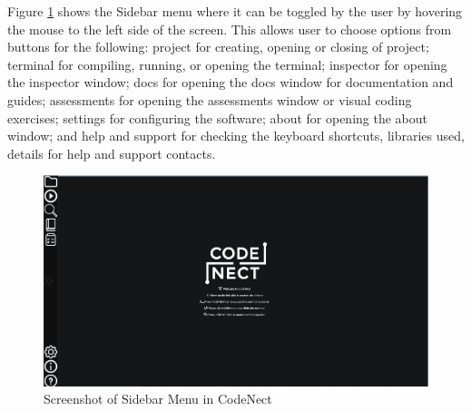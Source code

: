\parx
Figure \ref{fig:cn_sidebar} shows the Sidebar menu where it can be toggled by the user
by hovering the mouse to the left side of the screen. This allows user to choose
options from buttons for the following: project for creating, opening or closing
of project; terminal for compiling, running, or opening the terminal; inspector for
opening the inspector window; docs for opening the docs window for documentation and
guides; assessments for opening the assessments window or visual coding exercises;
settings for configuring the software; about for opening the about window; and help
and support for checking the keyboard shortcuts, libraries used, details for help
and support contacts.

\begin{figure}[H]
	\centering
	\captionsetup{justification=centering}
	\captionsetup[figure]{list=yes}
	\includegraphics[width=\linewidth]{media/sc_sidebar.png}
	\caption[Screenshot of Sidebar Menu in CodeNect]{Screenshot of Sidebar Menu in CodeNect}
	\label{fig:cn_sidebar}
\end{figure}
